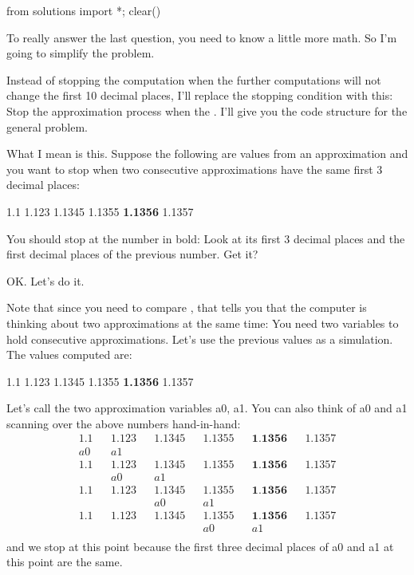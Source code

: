 \begin{python0}
from solutions import *; clear()
\end{python0}

To really answer the last question, you need to know a little more math.
So I'm going to simplify the problem.

Instead of stopping the computation when the further computations will
not change the first 10 decimal places, I'll replace the
stopping condition with this: Stop the approximation process when the
. I'll give you the code structure for the general
problem.

What I mean is this. Suppose the following are values from an
approximation and you want to stop when two consecutive approximations
have the same first 3 decimal places:
\begin{center}
1.1 1.123 1.1345 1.1355 \textbf{1.1356} 1.1357
\end{center}
You should stop at the number in bold: Look at its first 3 decimal
places and the first decimal places of the previous number. Get it?

OK. Let's do it.

Note that since you need to compare , that tells you that the computer is thinking about two
approximations at the same time: You need two variables to hold
consecutive approximations. Let's use the previous
values as a simulation. The values computed are:
\begin{center}
1.1 1.123 1.1345 1.1355 \textbf{1.1356} 1.1357
\end{center}
Let's call the two approximation variables a0, a1. You
can also think of a0 and a1 scanning over the above numbers
hand-in-hand:
\begin{align*}
1.1         &&1.123       &&1.1345      &&1.1355      &&\textbf{1.1356} &&1.1357 \\
a0         &&a1 \\
1.1         &&1.123       &&1.1345      &&1.1355      &&\textbf{1.1356} &&1.1357 \\
&&a0        &&a1 \\
1.1         &&1.123       &&1.1345      &&1.1355      &&\textbf{1.1356} &&1.1357 \\
&&&&a0       &&a1 \\
1.1         &&1.123       &&1.1345      &&1.1355      &&\textbf{1.1356} &&1.1357 \\
&&&&&&a0      &&a1 \\
\end{align*}
and we stop at this point because the first three decimal places of a0
and a1 at this point are the same.

